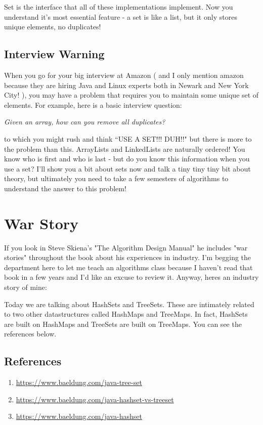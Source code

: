 \documentclass[12pt]{article}
\begin{document}
Set is the interface that all of these implementations implement. Now you understand it's most essential feature - a set is like a list, but it only stores unique elements, no duplicates! 

\subsection{Interview Warning}
When you go for your big interview at Amazon ( and I only mention amazon because they are hiring Java and Linux experts both in Newark and New York City! ), you may have a problem that requires you to maintain some unique set of elements. For example, here is a basic interview question:

{\Large\textit{Given an array, how can you remove all duplicates?}}

to which you might rush and think ``USE A SET!!! DUH!!" but there is more to the problem than this. ArrayLists and LinkedLists are naturally ordered! You know who is first and who is last - but do you know this information when you use a set? I'll show you a bit about sets now and talk a tiny tiny tiny bit about theory, but ultimately you need to take a few semesters of algorithms to understand the answer to this problem!

\section{War Story}
If you look in Steve Skiena's "The Algorithm Design Manual" he includes "war stories" throughout the book about his experiences in industry. I'm begging the department here to let me teach an algorithms class because I haven't read that book in a few years and I'd like an excuse to review it. Anyway, heres an industry story of mine:

Today we are talking about HashSets and TreeSets. These are intimately related to two other datastructures called HashMaps and TreeMaps. In fact, HashSets are built on HashMaps and TreeSets are built on TreeMaps. You can see the references below.

\subsection{References}
\begin{enumerate}
\item \url{https://www.baeldung.com/java-tree-set}
\item \url{https://www.baeldung.com/java-hashset-vs-treeset}
\item \url{https://www.baeldung.com/java-hashset}
\end{enumerate}
\end{document}
